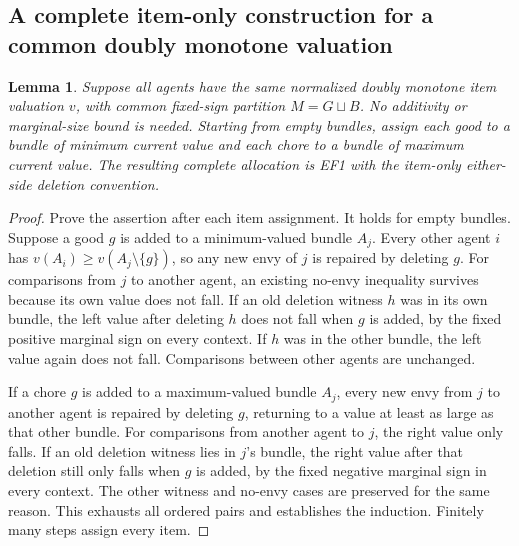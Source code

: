 \documentclass[11pt,a4paper]{article}
\newtheorem{lemma}[theorem]{Lemma}
\theoremstyle{remark}\newtheorem{remark}[theorem]{Remark}
\begin{document}
\subsection{A complete item-only construction for a common doubly monotone valuation}
\begin{lemma}\label{lem:commonEF1}
Suppose all agents have the same normalized doubly monotone item valuation $v$, with common fixed-sign partition $M=G\sqcup B$. No additivity or marginal-size bound is needed. Starting from empty bundles, assign each good to a bundle of minimum current value and each chore to a bundle of maximum current value. The resulting complete allocation is EF1 with the item-only either-side deletion convention.
\end{lemma}
\begin{proof}
Prove the assertion after each item assignment. It holds for empty bundles. Suppose a good $g$ is added to a minimum-valued bundle $A_j$. Every other agent $i$ has $v(A_i)\ge v(A_j\setminus\{g\})$, so any new envy of $j$ is repaired by deleting $g$. For comparisons from $j$ to another agent, an existing no-envy inequality survives because its own value does not fall. If an old deletion witness $h$ was in its own bundle, the left value after deleting $h$ does not fall when $g$ is added, by the fixed positive marginal sign on every context. If $h$ was in the other bundle, the left value again does not fall. Comparisons between other agents are unchanged.

If a chore $g$ is added to a maximum-valued bundle $A_j$, every new envy from $j$ to another agent is repaired by deleting $g$, returning to a value at least as large as that other bundle. For comparisons from another agent to $j$, the right value only falls. If an old deletion witness lies in $j$'s bundle, the right value after that deletion still only falls when $g$ is added, by the fixed negative marginal sign in every context. The other witness and no-envy cases are preserved for the same reason. This exhausts all ordered pairs and establishes the induction. Finitely many steps assign every item.
\end{proof}
\end{document}
